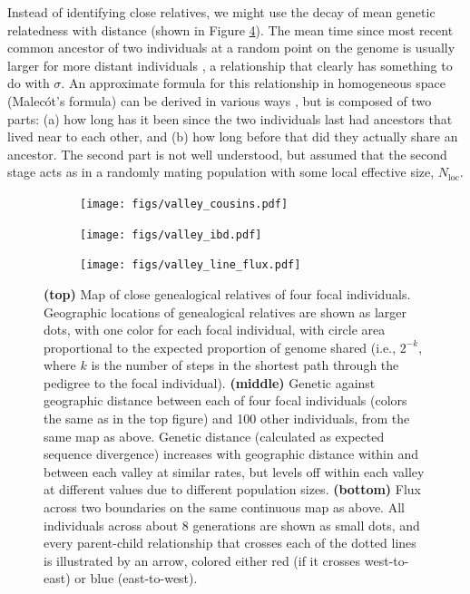 \documentclass{ar-1col}
\begin{document}
Instead of identifying close relatives,
we might use the decay of mean genetic relatedness with distance
(shown in Figure \ref{fig:dispersal}).
The mean time since most recent common ancestor 
of two individuals at a random point on the genome
is usually larger for more distant individuals \citep{ibd_review},
a relationship that clearly has something to do with $\sigma$.
An approximate formula for this relationship
in homogeneous space (Malec\'ot's formula)
can be derived in various ways 
\citep{malecot, sawyer1976branching, rousset_1997, barton-depaulis-etheridge, robledoarnuncio, ringbauer2017inferring, alasadi2018estimating},
but is composed of two parts: 
(a) how long has it been since the two individuals last had ancestors that lived near to each other,
and (b) how long before that did they actually share an ancestor.
The second part is not well understood,
but \citet{malecot} assumed that the second stage acts as in a randomly mating population
with some local effective size, $N_\text{loc}$.


\begin{figure}	%
    \centering
    \begin{subfigure}{0.85\textwidth}
        \centering
        \texttt{[image: figs/valley\_cousins.pdf]}
        \label{cousin_map}
    \end{subfigure}
    \begin{subfigure}{0.75\textwidth}
        \centering
        \texttt{[image: figs/valley\_ibd.pdf]}
        \label{ibd}
    \end{subfigure}
    \begin{subfigure}{0.85\textwidth}
        \centering
        \texttt{[image: figs/valley\_line\_flux.pdf]}
        \label{valleyflux}
    \end{subfigure}
        \caption{
            \textbf{(top)} Map of close genealogical relatives of four focal individuals.
            Geographic locations of 
            genealogical relatives are shown as larger dots, with one color for each focal individual,
            with circle area proportional to the expected proportion of genome shared
            (i.e., $2^{-k}$, where $k$ is the number of steps in the shortest path through the pedigree to the focal individual).
            \textbf{(middle)}
            Genetic against geographic distance between each of four focal individuals
            (colors the same as in the top figure)
            and 100 other individuals, from the same map as above.
            Genetic distance (calculated as expected sequence divergence)
            increases with geographic distance within and between each valley at similar rates,
            but levels off within each valley at different values
            due to different population sizes.
            \textbf{(bottom)}
            Flux across two boundaries on the same continuous map as above.
            All individuals across about 8 generations are shown as small dots,
            and every parent-child relationship that crosses each of the dotted lines
            is illustrated by an arrow, colored either red (if it crosses west-to-east) or blue (east-to-west).
        }
        \label{fig:dispersal}
\end{figure}
\end{document}
